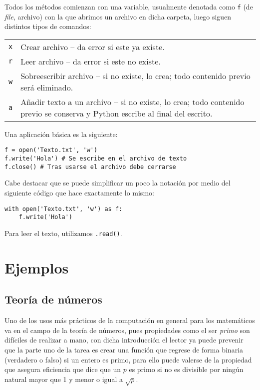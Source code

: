 \documentclass[11pt,twoside]{report}
\begin{document}
Todos los métodos comienzan con una variable, usualmente denotada como \lstinline|f| (de \textit{file}, archivo) con la que abrimos un archivo en dicha carpeta, luego siguen distintos tipos de comandos:
\begin{center}
	\begin{longtable}{lp{8cm}}\hline
	\lstinline|x| & Crear archivo -- da error si este ya existe.\\
	\lstinline|r| & Leer archivo -- da error si este no existe.\\
	\lstinline|w| & Sobreescribir archivo -- si no existe, lo crea; todo contenido previo será eliminado.\\
	\lstinline|a| & Añadir texto a un archivo -- si no existe, lo crea; todo contenido previo se conserva y Python escribe al final del escrito.\\ \hline
	\end{longtable}
\end{center}
Una aplicación básica es la siguiente:
\begin{lstlisting}
f = open('Texto.txt', 'w')
f.write('Hola') # Se escribe en el archivo de texto
f.close() # Tras usarse el archivo debe cerrarse
\end{lstlisting}
Cabe destacar que se puede simplificar un poco la notación por medio del siguiente código que hace exactamente lo mismo:
\begin{lstlisting}
with open('Texto.txt', 'w') as f:
	f.write('Hola')
\end{lstlisting}
Para leer el texto, utilizamos \lstinline|.read()|.

\section{Ejemplos}
\subsection*{Teoría de números}
Uno de los usos más prácticos de la computación en general para los matemáticos va en el campo de la teoría de números, pues propiedades como el ser \textit{primo} son difíciles de realizar a mano, con dicha introducción el lector ya puede prevenir que la parte uno de la tarea es crear una función que regrese de forma binaria (verdadero o falso) si un entero es primo, para ello puede valerse de la propiedad que asegura eficiencia que dice que un $p$ es primo si no es divisible por ningún natural mayor que 1 y menor o igual a $\sqrt{p}$.
\end{document}
